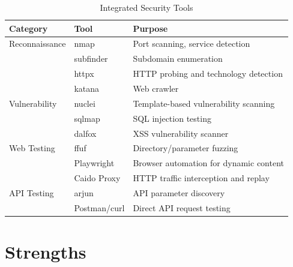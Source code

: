 \documentclass[12pt,a4paper]{article}
\begin{document}
\begin{table}[H]
\centering
\caption{Integrated Security Tools}
\begin{tabularx}{\textwidth}{llX}
\toprule
\textbf{Category} & \textbf{Tool} & \textbf{Purpose} \\
\midrule
Reconnaissance & nmap & Port scanning, service detection \\
               & subfinder & Subdomain enumeration \\
               & httpx & HTTP probing and technology detection \\
               & katana & Web crawler \\
Vulnerability & nuclei & Template-based vulnerability scanning \\
              & sqlmap & SQL injection testing \\
              & dalfox & XSS vulnerability scanner \\
Web Testing & ffuf & Directory/parameter fuzzing \\
            & Playwright & Browser automation for dynamic content \\
            & Caido Proxy & HTTP traffic interception and replay \\
API Testing & arjun & API parameter discovery \\
            & Postman/curl & Direct API request testing \\
\bottomrule
\end{tabularx}
\end{table}

\section{Strengths}
\end{document}
